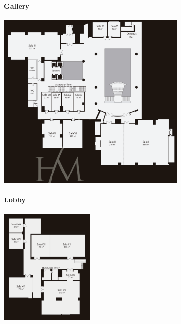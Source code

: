 \label{Floorplan}

\paragraph{Gallery}
\begin{center}
  \includegraphics[width=0.7\textwidth]{img/gallery}
\end{center}

\paragraph{Lobby}
\begin{center}
  \includegraphics[width=0.35\textwidth]{img/lobby}
\end{center}

\vfil
\begin{center}
\end{center}
\vfil
\eject

\newpage

